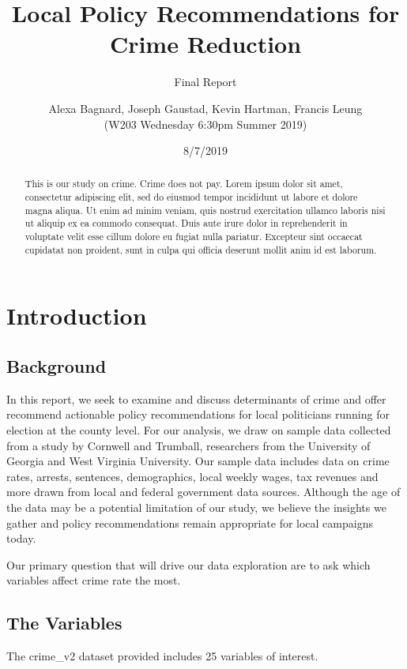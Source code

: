 \documentclass[]{article}
\title{Local Policy Recommendations for Crime Reduction}
\subtitle{Final Report}
\author{Alexa Bagnard, Joseph Gaustad, Kevin Hartman, Francis Leung \\ (W203 Wednesday 6:30pm Summer 2019)}
\date{8/7/2019}
\begin{document}
\maketitle
\begin{abstract}
This is our study on crime. Crime does not pay. Lorem ipsum dolor sit
amet, consectetur adipiscing elit, sed do eiusmod tempor incididunt ut
labore et dolore magna aliqua. Ut enim ad minim veniam, quis nostrud
exercitation ullamco laboris nisi ut aliquip ex ea commodo consequat.
Duis aute irure dolor in reprehenderit in voluptate velit esse cillum
dolore eu fugiat nulla pariatur. Excepteur sint occaecat cupidatat non
proident, sunt in culpa qui officia deserunt mollit anim id est laborum.
\end{abstract}

{
\setcounter{tocdepth}{2}
\tableofcontents
}
\hypertarget{introduction}{%
\section{Introduction}\label{introduction}}

\hypertarget{background}{%
\subsection{Background}\label{background}}

In this report, we seek to examine and discuss determinants of crime and
offer recommend actionable policy recommendations for local politicians
running for election at the county level. For our analysis, we draw on
sample data collected from a study by Cornwell and Trumball, researchers
from the University of Georgia and West Virginia University. Our sample
data includes data on crime rates, arrests, sentences, demographics,
local weekly wages, tax revenues and more drawn from local and federal
government data sources. Although the age of the data may be a potential
limitation of our study, we believe the insights we gather and policy
recommendations remain appropriate for local campaigns today.

Our primary question that will drive our data exploration are to ask
which variables affect crime rate the most.

\hypertarget{the-variables}{%
\subsection{The Variables}\label{the-variables}}

The crime\_v2 dataset provided includes 25 variables of interest.
\end{document}
